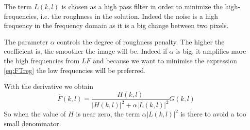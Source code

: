 The term $L(k,l)$ is chosen as a high pass filter in order to minimize the high-frequencies, i.e. the roughness in the solution. Indeed the noise is a high frequency in the frequency domain as it is a big change between two pixels. 

The parameter $\alpha$ controls the degree of roughness penalty. The higher the coefficient is, the smoother the image will be\cite{mathWorksWiener}. Indeed if $\alpha$ is big, it amplifies more the high frequencies from $LF$ and because we want to minimise the expression \eqref{eq:FTreg} the low frequencies will be preferred.

With the derivative we obtain
\begin{equation}
\hat{F}(k,l) = \frac{H(k,l)}{|H(k,l)|^2 + \alpha |L(k,l)|^2} G(k,l)
\end{equation}
So when the value of $H$ is near zero, the term $\alpha |L(k,l)|^2$ is there to avoid a too small denominator. 


